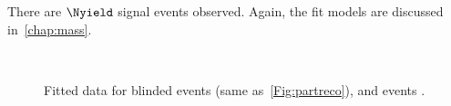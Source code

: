 There are $\Nyield$ \Lbpijpsi signal events observed. Again, the fit models are discussed in~\autoref{chap:mass}.



\begin{figure}[!ht]\def\nh{0.3\textwidth}
  \centering
  \\

  \caption{Fitted data for blinded \Lbpi events \protect{} (same as~\autoref{Fig:partreco}), and \Lbpijpsi events \protect{}. }
  \label{Fig:optpointfits}
\end{figure}









 
 
